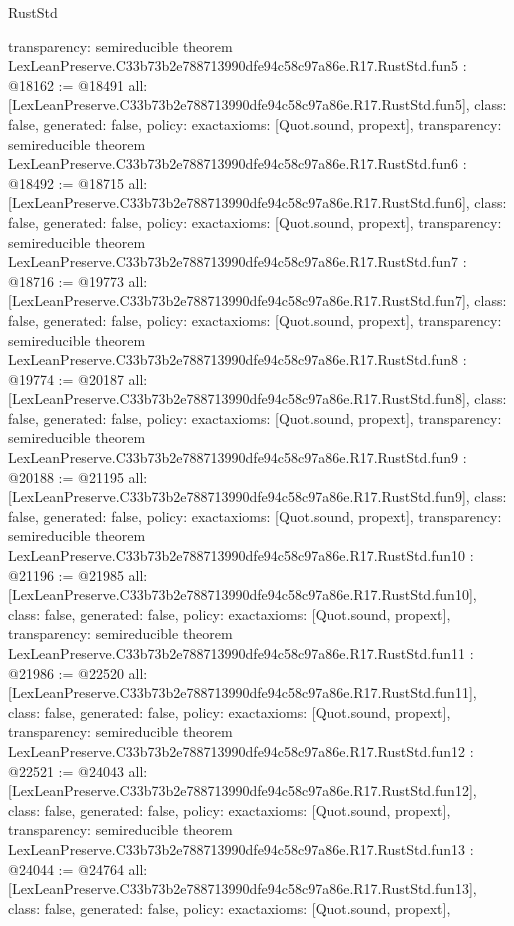 \begin{lexlean}{RustStd}
\begin{coremodule}
{  transparency: semireducible
}
theorem LexLeanPreserve.C33b73b2e788713990dfe94c58c97a86e.R17.RustStd.fun5 : @18162 := @18491 {
  all: [LexLeanPreserve.C33b73b2e788713990dfe94c58c97a86e.R17.RustStd.fun5],
  class: false,
  generated: false,
  policy: exact{axioms: [Quot.sound, propext]},
  transparency: semireducible
}
theorem LexLeanPreserve.C33b73b2e788713990dfe94c58c97a86e.R17.RustStd.fun6 : @18492 := @18715 {
  all: [LexLeanPreserve.C33b73b2e788713990dfe94c58c97a86e.R17.RustStd.fun6],
  class: false,
  generated: false,
  policy: exact{axioms: [Quot.sound, propext]},
  transparency: semireducible
}
theorem LexLeanPreserve.C33b73b2e788713990dfe94c58c97a86e.R17.RustStd.fun7 : @18716 := @19773 {
  all: [LexLeanPreserve.C33b73b2e788713990dfe94c58c97a86e.R17.RustStd.fun7],
  class: false,
  generated: false,
  policy: exact{axioms: [Quot.sound, propext]},
  transparency: semireducible
}
theorem LexLeanPreserve.C33b73b2e788713990dfe94c58c97a86e.R17.RustStd.fun8 : @19774 := @20187 {
  all: [LexLeanPreserve.C33b73b2e788713990dfe94c58c97a86e.R17.RustStd.fun8],
  class: false,
  generated: false,
  policy: exact{axioms: [Quot.sound, propext]},
  transparency: semireducible
}
theorem LexLeanPreserve.C33b73b2e788713990dfe94c58c97a86e.R17.RustStd.fun9 : @20188 := @21195 {
  all: [LexLeanPreserve.C33b73b2e788713990dfe94c58c97a86e.R17.RustStd.fun9],
  class: false,
  generated: false,
  policy: exact{axioms: [Quot.sound, propext]},
  transparency: semireducible
}
theorem LexLeanPreserve.C33b73b2e788713990dfe94c58c97a86e.R17.RustStd.fun10 : @21196 := @21985 {
  all: [LexLeanPreserve.C33b73b2e788713990dfe94c58c97a86e.R17.RustStd.fun10],
  class: false,
  generated: false,
  policy: exact{axioms: [Quot.sound, propext]},
  transparency: semireducible
}
theorem LexLeanPreserve.C33b73b2e788713990dfe94c58c97a86e.R17.RustStd.fun11 : @21986 := @22520 {
  all: [LexLeanPreserve.C33b73b2e788713990dfe94c58c97a86e.R17.RustStd.fun11],
  class: false,
  generated: false,
  policy: exact{axioms: [Quot.sound, propext]},
  transparency: semireducible
}
theorem LexLeanPreserve.C33b73b2e788713990dfe94c58c97a86e.R17.RustStd.fun12 : @22521 := @24043 {
  all: [LexLeanPreserve.C33b73b2e788713990dfe94c58c97a86e.R17.RustStd.fun12],
  class: false,
  generated: false,
  policy: exact{axioms: [Quot.sound, propext]},
  transparency: semireducible
}
theorem LexLeanPreserve.C33b73b2e788713990dfe94c58c97a86e.R17.RustStd.fun13 : @24044 := @24764 {
  all: [LexLeanPreserve.C33b73b2e788713990dfe94c58c97a86e.R17.RustStd.fun13],
  class: false,
  generated: false,
  policy: exact{axioms: [Quot.sound, propext]},
}
\end{coremodule}
\end{lexlean}
